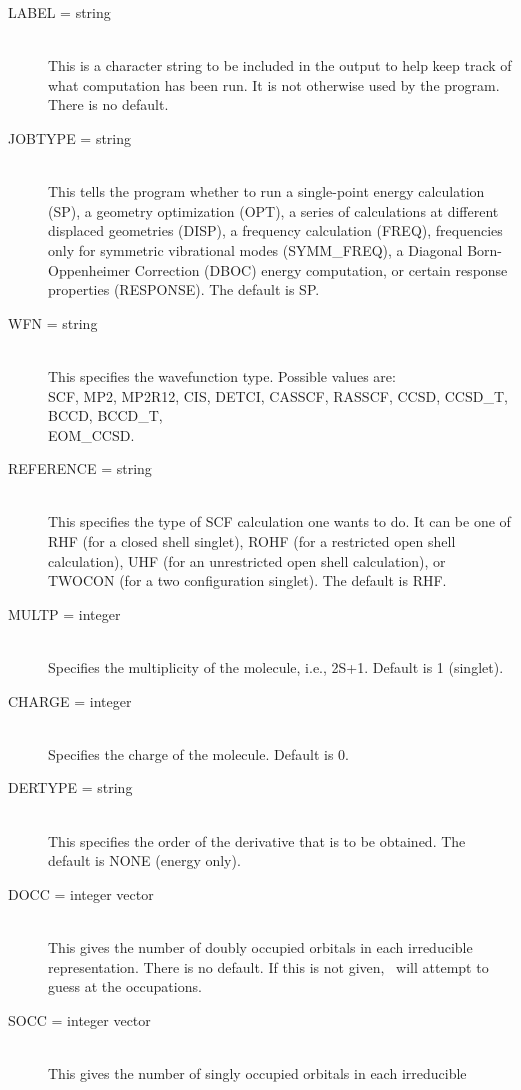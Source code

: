 \begin{description}
\item[LABEL = string]\mbox{}\\
This is a character string to be included in the output to help keep track
of what computation has been run.  It is not otherwise used by the program.
There is no default.
\item[JOBTYPE = string]\mbox{}\\
This tells the program whether to run a single-point energy calculation
(SP), a geometry optimization (OPT), a series of calculations at 
different displaced geometries (DISP), a frequency calculation (FREQ),
frequencies only for symmetric vibrational modes (SYMM\_FREQ), 
a Diagonal Born-Oppenheimer Correction (DBOC) energy computation,
or certain response properties (RESPONSE).
The default is SP.
\item[WFN = string]\mbox{}\\
This specifies the wavefunction type.  Possible values are:\\ 
SCF, MP2, MP2R12, CIS, DETCI, CASSCF, RASSCF, CCSD, CCSD\_T, BCCD, BCCD\_T,\\
EOM\_CCSD. 
\item[REFERENCE = string]\mbox{}\\
This specifies the type of SCF calculation one wants to do.  It
can be one of RHF (for a closed  shell  singlet), ROHF (for
a restricted open shell calculation), UHF (for an unrestricted
open shell calculation), or TWOCON (for a two configuration
singlet).  The default is RHF.
\item[MULTP = integer]\mbox{}\\
Specifies the multiplicity of the molecule, i.e., 2S+1.  Default
is 1 (singlet).
\item[CHARGE = integer]\mbox{}\\
Specifies the charge of the molecule.  Default is 0.
\item[DERTYPE = string]\mbox{}\\
This specifies the order of the derivative that is to be obtained.
The default is NONE (energy only).
\item[DOCC = integer vector]\mbox{}\\
This gives the number of doubly occupied orbitals in each irreducible
representation.  There is no default.  If this is not given, 
\PSIcscf\  will attempt to guess at the occupations.
\item[SOCC = integer vector]\mbox{} \\
This gives the number of singly occupied orbitals in each irreducible 

\end{description}
